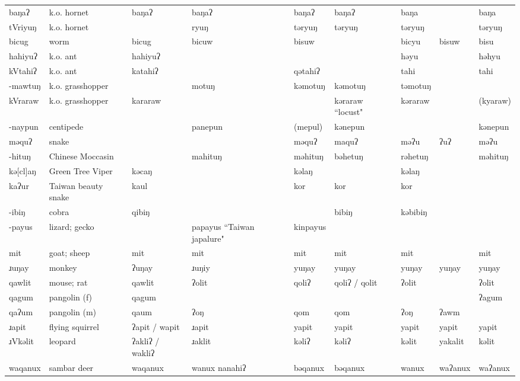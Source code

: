 \begin{landscape}
\begin{longtable}{*{9}{>{\raggedright\arraybackslash}p{}}}
\text{*}baŋaʔ & k.o. hornet & baŋaʔ & baŋaʔ & baŋaʔ & baŋaʔ & baŋa &  & baŋa\\
\text{*}tVriyuŋ & k.o. hornet &  & ryuŋ & təryuŋ & təryuŋ & təryuŋ &  & təryuŋ\\
\text{*}bicug & worm & bicug & bicuw & bisuw &  & bicyu & bisuw & bisu\\
\text{*}hahiyuʔ & k.o. ant & hahiyuʔ &  &  &  & həyu &  & həhyu\\
\text{*}kVtahiʔ & k.o. ant & katahiʔ &  & qətahiʔ &  & tahi &  & tahi\\
\text{*}-mawtuŋ & k.o. grasshopper &  & motuŋ & kəmotuŋ & kəmotuŋ & təmotuŋ &  & \\
\text{*}kVraraw & k.o. grasshopper & kararaw &  &  & kəraraw ``locust" & kəraraw &  & (kyaraw)\\
\text{*}-naypun & centipede &  & panepun & (mepul) & kənepun &  &  & kənepun\\
\text{*}məquʔ & snake &  &  & məquʔ & maquʔ & məʔu & ʔuʔ & məʔu\\
\text{*}-hituŋ & Chinese Moccasin &  & mahituŋ & məhituŋ & bəhetuŋ & rəhetuŋ &  & məhituŋ\\
\text{*}kə[cl]aŋ & Green Tree Viper & kəcaŋ &  & kəlaŋ &  & kəlaŋ &  & \\
\text{*}kaʔur & Taiwan beauty snake & kaul &  & kor & kor & kor &  & \\
\text{*}-ibiŋ & cobra & qibiŋ &  &  & bibiŋ & kəbibiŋ &  & \\
\text{*}-payus & lizard; gecko &  & papayus ``Taiwan japalure" & kinpayus &  &  &  & \\
\text{*}mit & goat; sheep & mit & mit & mit & mit & mit &  & mit\\
\text{*}ɹuŋay & monkey & ʔuŋay & ɹuŋiy & yuŋay & yuŋay & yuŋay & yuŋay & yuŋay\\
\text{*}qawlit & mouse; rat & qawlit & ʔolit & qoliʔ & qoliʔ / qolit & ʔolit &  & ʔolit\\
\text{*}qagum & pangolin (f) & qagum &  &  &  &  &  & ʔagum\\
\text{*}qaʔum & pangolin (m) & qaum & ʔoŋ & qom & qom & ʔoŋ & ʔawm & \\
\text{*}ɹapit & flying squirrel & ʔapit / wapit & ɹapit & yapit & yapit & yapit & yapit & yapit\\
\text{*}ɹVkəlit & leopard & ʔakliʔ / wakliʔ & ɹaklit & kəliʔ & kəliʔ & kəlit & yakalit & kəlit\\
\text{*}waqanux & sambar deer & waqanux & wanux nanahiʔ & bəqanux & bəqanux & wanux & waʔanux & waʔanux\\

\end{longtable}
\end{landscape}

